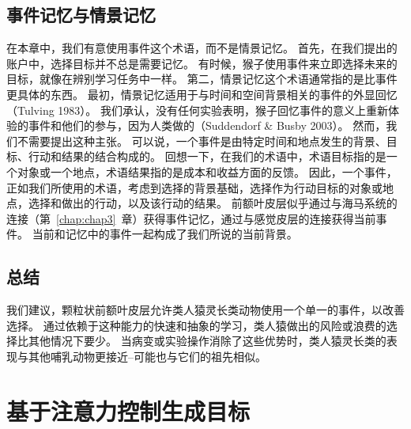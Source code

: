\subsection{事件记忆与情景记忆}

在本章中，我们有意使用事件这个术语，而不是情景记忆。
首先，在我们提出的账户中，选择目标并不总是需要记忆。
有时候，猴子使用事件来立即选择未来的目标，就像在辨别学习任务中一样。
第二，情景记忆这个术语通常指的是比事件更具体的东西。
最初，情景记忆适用于与时间和空间背景相关的事件的外显回忆（Tulving 1983）。
我们承认，没有任何实验表明，猴子回忆事件的意义上重新体验的事件和他们的参与，因为人类做的（Suddendorf \& Busby 2003）。
然而，我们不需要提出这种主张。
可以说，一个事件是由特定时间和地点发生的背景、目标、行动和结果的结合构成的。
回想一下，在我们的术语中，术语目标指的是一个对象或一个地点，术语结果指的是成本和收益方面的反馈。
因此，一个事件，正如我们所使用的术语，考虑到选择的背景基础，选择作为行动目标的对象或地点，选择和做出的行动，以及该行动的结果。
前额叶皮层似乎通过与海马系统的连接（第~\ref{chap:chap3}~章）获得事件记忆，通过与感觉皮层的连接获得当前事件。
当前和记忆中的事件一起构成了我们所说的当前背景。



\subsection{总结}

我们建议，颗粒状前额叶皮层允许类人猿灵长类动物使用一个单一的事件，以改善选择。
通过依赖于这种能力的快速和抽象的学习，类人猿做出的风险或浪费的选择比其他情况下要少。
当病变或实验操作消除了这些优势时，类人猿灵长类的表现与其他哺乳动物更接近--可能也与它们的祖先相似。



\section{基于注意力控制生成目标}

